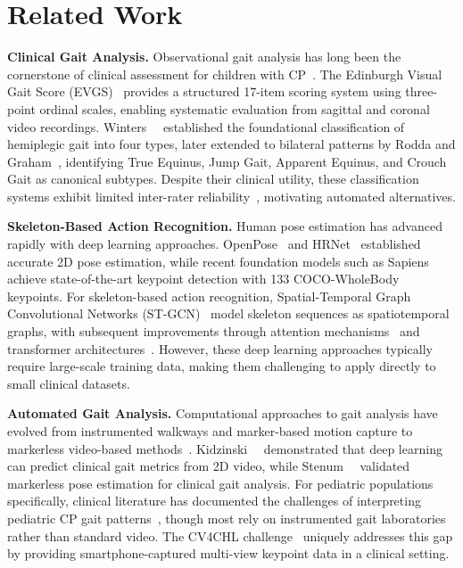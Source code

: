 \section{Related Work}
\label{sec:related}

\noindent\textbf{Clinical Gait Analysis.}
Observational gait analysis has long been the cornerstone of clinical assessment for children with CP~\cite{gage2009treatment}. The Edinburgh Visual Gait Score (EVGS)~\cite{read2003edinburgh} provides a structured 17-item scoring system using three-point ordinal scales, enabling systematic evaluation from sagittal and coronal video recordings. Winters~\etal~\cite{winters1987gait} established the foundational classification of hemiplegic gait into four types, later extended to bilateral patterns by Rodda and Graham~\cite{rodda2004classification}, identifying True Equinus, Jump Gait, Apparent Equinus, and Crouch Gait as canonical subtypes. Despite their clinical utility, these classification systems exhibit limited inter-rater reliability~\cite{wren2005reliability}, motivating automated alternatives.

\noindent\textbf{Skeleton-Based Action Recognition.}
Human pose estimation has advanced rapidly with deep learning approaches. OpenPose~\cite{cao2017realtime} and HRNet~\cite{sun2019deep} established accurate 2D pose estimation, while recent foundation models such as Sapiens~\cite{khirodkar2024sapiens} achieve state-of-the-art keypoint detection with 133 COCO-WholeBody~\cite{jin2020whole} keypoints. For skeleton-based action recognition, Spatial-Temporal Graph Convolutional Networks (ST-GCN)~\cite{yan2018spatial} model skeleton sequences as spatiotemporal graphs, with subsequent improvements through attention mechanisms~\cite{shi2019two} and transformer architectures~\cite{plizzari2021skeleton, 11484350}. However, these deep learning approaches typically require large-scale training data, making them challenging to apply directly to small clinical datasets.

\noindent\textbf{Automated Gait Analysis.}
Computational approaches to gait analysis have evolved from instrumented walkways and marker-based motion capture to markerless video-based methods~\cite{stenum2021two, kidzinski2020deep}. Kidzinski~\etal~\cite{kidzinski2020deep} demonstrated that deep learning can predict clinical gait metrics from 2D video, while Stenum~\etal~\cite{stenum2021two} validated markerless pose estimation for clinical gait analysis. For pediatric populations specifically, clinical literature has documented the challenges of interpreting pediatric CP gait patterns~\cite{rodda2004classification,wren2005reliability}, though most rely on instrumented gait laboratories rather than standard video. The CV4CHL challenge~\cite{cv4chl2026} uniquely addresses this gap by providing smartphone-captured multi-view keypoint data in a clinical setting.

